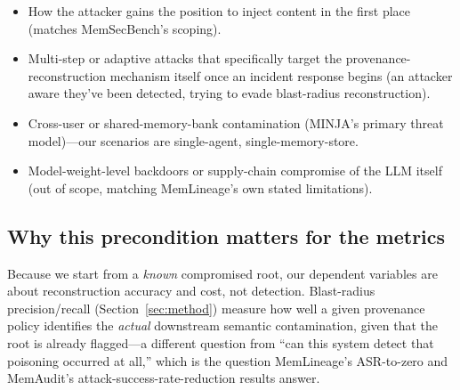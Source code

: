 \begin{itemize}
\item How the attacker gains the position to inject content in the
  first place (matches MemSecBench's scoping).
\item Multi-step or adaptive attacks that specifically target the
  provenance-reconstruction mechanism itself once an incident response
  begins (an attacker aware they've been detected, trying to evade
  blast-radius reconstruction).
\item Cross-user or shared-memory-bank contamination (MINJA's primary
  threat model)---our scenarios are single-agent, single-memory-store.
\item Model-weight-level backdoors or supply-chain compromise of the
  LLM itself (out of scope, matching MemLineage's own stated
  limitations).
\end{itemize}

\subsection{Why this precondition matters for the metrics}

Because we start from a \emph{known} compromised root, our dependent
variables are about reconstruction accuracy and cost, not detection.
Blast-radius precision/recall (Section~\ref{sec:method}) measure how well
a given provenance policy identifies the \emph{actual} downstream
semantic contamination, given that the root is already flagged---a
different question from ``can this system detect that poisoning
occurred at all,'' which is the question MemLineage's ASR-to-zero and
MemAudit's attack-success-rate-reduction results answer.
